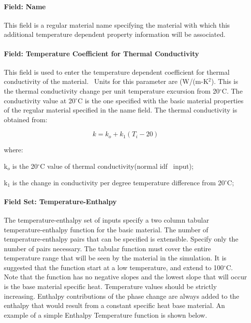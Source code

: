 \paragraph{Field: Name}\label{field-name-5-024}

This field is a regular material name specifying the material with which this additional temperature dependent property information will be associated.

\paragraph{Field: Temperature Coefficient for Thermal Conductivity}\label{field-temperature-coefficient-for-thermal-conductivity}

This field is used to enter the temperature dependent coefficient for thermal conductivity of the material.~ Units for this parameter are (W/(m-K\(^{2}\)). This is the thermal conductivity change per unit temperature excursion from 20$^\circ$C. The conductivity value at 20$^\circ$C is the one specified with the basic material properties of the regular material specified in the name field. The thermal conductivity is obtained from:

\begin{equation}
k = {k_o} + {k_1}({T_i} - 20)
\end{equation}

where:

k\(_{o}\) is the 20$^\circ$C value of thermal conductivity(normal idf~ input);

k\(_{1}\) is the change in conductivity per degree temperature difference from 20$^\circ$C;

\paragraph{Field Set: Temperature-Enthalpy}\label{field-set-temperature-enthalpy}

The temperature-enthalpy set of inputs specify a two column tabular temperature-enthalpy function for the basic material. The number of temperature-enthalpy pairs that can be specified is extensible. Specify only the number of pairs necessary. The tabular function must cover the entire temperature range that will be seen by the material in the simulation. It is suggested that the function start at a low temperature, and extend to 100$^\circ$C. Note that the function has no negative slopes and the lowest slope that will occur is the base material specific heat. Temperature values should be strictly increasing. Enthalpy contributions of the phase change are always added to the enthalpy that would result from a constant specific heat base material. An example of a simple Enthalpy Temperature function is shown below.

